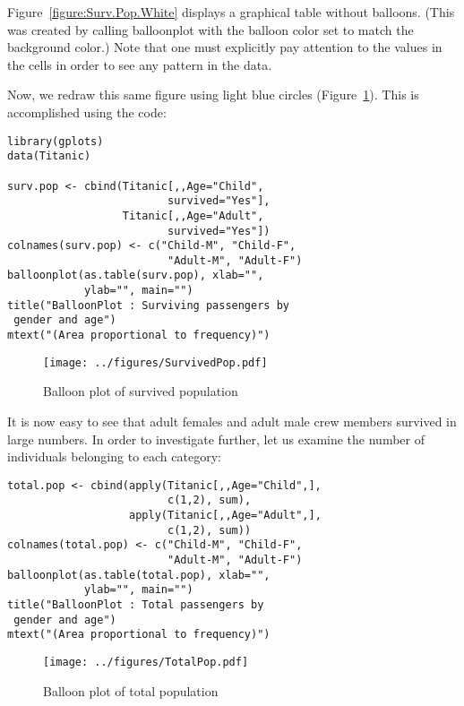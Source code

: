 \documentclass[a4paper]{report}
\begin{document}
\begin{article}
Figure~\ref{figure:Surv.Pop.White} displays a graphical table
without balloons.  (This was created by calling balloonplot with
the balloon color set to match the background color.)  Note
that one must explicitly pay attention to the values in the cells in
order to see any pattern in the data.

Now, we redraw this same figure using light blue circles
(Figure~\ref{figure:Surv.Pop}).  This is accomplished using the code:

{\small
\begin{verbatim}
library(gplots)
data(Titanic)

surv.pop <- cbind(Titanic[,,Age="Child", 
                         survived="Yes"],
                  Titanic[,,Age="Adult", 
                         survived="Yes"])
colnames(surv.pop) <- c("Child-M", "Child-F",
                         "Adult-M", "Adult-F")
balloonplot(as.table(surv.pop), xlab="", 
            ylab="", main="")
title("BalloonPlot : Surviving passengers by
 gender and age")
mtext("(Area proportional to frequency)")
\end{verbatim}
 }

\begin{figure}
\texttt{[image: ../figures/SurvivedPop.pdf]}
\caption{\label{figure:Surv.Pop}
Balloon plot of survived population}
\end{figure}

It is now easy to see that adult females and adult male crew
members survived in large numbers. In order to investigate further,
let us examine the number of individuals belonging to each
category:

\vspace{-0.25in}

{\small
\begin{verbatim}
total.pop <- cbind(apply(Titanic[,,Age="Child",],
                         c(1,2), sum), 
                   apply(Titanic[,,Age="Adult",], 
                         c(1,2), sum))
colnames(total.pop) <- c("Child-M", "Child-F", 
                         "Adult-M", "Adult-F")
balloonplot(as.table(total.pop), xlab="",
            ylab="", main="")
title("BalloonPlot : Total passengers by
 gender and age")
mtext("(Area proportional to frequency)")
\end{verbatim}
 }


\begin{figure}
\texttt{[image: ../figures/TotalPop.pdf]}
\caption{\label{figure:Total.Pop}
Balloon plot of total population}
\end{figure}


\end{article}
\end{document}
